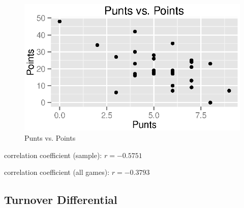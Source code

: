 \documentclass{exam}
\begin{document}
  \begin{figure}[H]
    \centering
    \includegraphics{figures/nfl/punts_vs_points.eps}
    \caption{Punts vs. Points}
  \end{figure}

  \begin{itemize*}
    \item correlation coefficient (sample): $r = -0.5751$
    \item correlation coefficient (all games): $r = -0.3793$
  \end{itemize*}

  \subsection{Turnover Differential}
\end{document}
